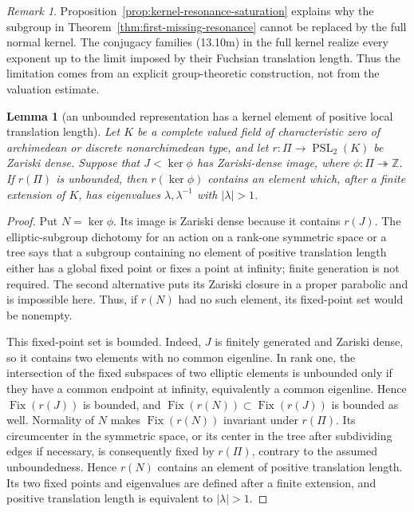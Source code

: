 \documentclass[11pt,reqno]{amsart}
\newtheorem{lemma}[theorem]{Lemma}
\theoremstyle{definition}
\theoremstyle{remark}
\newtheorem{remark}[theorem]{Remark}
\newcommand{\Z}{\mathbb Z}
\newcommand{\PSL}{\operatorname{PSL}}
\begin{document}
\begin{remark}
Proposition~\ref{prop:kernel-resonance-saturation} explains why the
subgroup in Theorem~\ref{thm:first-missing-resonance} cannot be replaced
by the full normal kernel.  The conjugacy families (13.10m) in the full
kernel realize every exponent up to the limit imposed by their Fuchsian
translation length.  Thus the limitation comes from an explicit
group-theoretic construction, not from the valuation estimate.
\end{remark}

\begin{lemma}[an unbounded representation has a kernel element of positive local translation length]
\label{lem:loxodromic-in-kernel}
Let \(K\) be a complete valued field of characteristic zero of
archimedean or discrete nonarchimedean type, and let
\(r\colon\Pi\to\PSL_2(K)\) be Zariski dense.  Suppose that
\(J<\ker\phi\) has Zariski-dense image, where
\(\phi\colon\Pi\twoheadrightarrow\Z\).  If \(r(\Pi)\) is unbounded, then
\(r(\ker\phi)\) contains an element which, after a finite extension of
\(K\), has eigenvalues \(\lambda,\lambda^{-1}\) with
\(|\lambda|>1\).
\end{lemma}

\begin{proof}
Put \(N=\ker\phi\).  Its image is Zariski dense because it contains
\(r(J)\).  The elliptic-subgroup dichotomy for an action on a rank-one
symmetric space or a tree says that a subgroup containing no element of
positive translation length either has a global fixed point or fixes a
point at infinity; finite generation is not required.  The second
alternative puts its Zariski closure in a proper parabolic and is
impossible here.  Thus, if \(r(N)\) had no such element, its fixed-point
set would be nonempty.

This fixed-point set is bounded.  Indeed, \(J\) is finitely generated and
Zariski dense, so it contains two elements with no common eigenline.  In
rank one, the intersection of the fixed subspaces of two elliptic elements
is unbounded only if they have a common endpoint at infinity, equivalently
a common eigenline.  Hence \(\operatorname{Fix}(r(J))\) is bounded, and
\(\operatorname{Fix}(r(N))\subset\operatorname{Fix}(r(J))\) is bounded as
well.  Normality of \(N\) makes \(\operatorname{Fix}(r(N))\) invariant
under \(r(\Pi)\).  Its circumcenter in the symmetric space, or its center
in the tree after subdividing edges if necessary, is consequently fixed
by \(r(\Pi)\), contrary to the assumed unboundedness.  Hence \(r(N)\)
contains an element of positive translation length.  Its two fixed points
and eigenvalues are defined after a finite extension, and positive
translation length is equivalent to \(|\lambda|>1\).
\end{proof}
\end{document}
